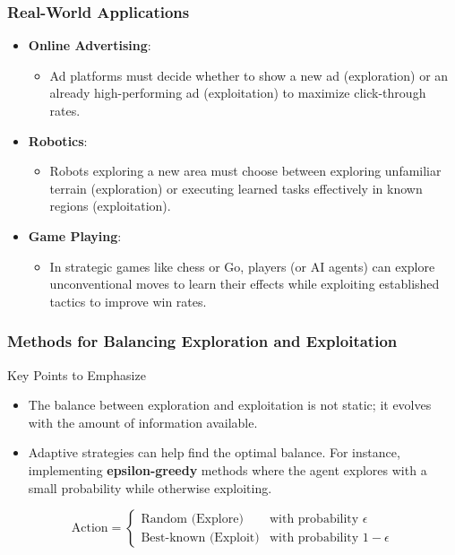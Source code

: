 \documentclass[aspectratio=169]{beamer}
\begin{document}
\begin{frame}[fragile]
    \frametitle{Real-World Applications}

    \begin{itemize}
        \item \textbf{Online Advertising}:
            \begin{itemize}
                \item Ad platforms must decide whether to show a new ad (exploration) or an already high-performing ad (exploitation) to maximize click-through rates.
            \end{itemize}
        
        \item \textbf{Robotics}:
            \begin{itemize}
                \item Robots exploring a new area must choose between exploring unfamiliar terrain (exploration) or executing learned tasks effectively in known regions (exploitation).
            \end{itemize}
        
        \item \textbf{Game Playing}:
            \begin{itemize}
                \item In strategic games like chess or Go, players (or AI agents) can explore unconventional moves to learn their effects while exploiting established tactics to improve win rates.
            \end{itemize}
    \end{itemize}
\end{frame}

\begin{frame}[fragile]
    \frametitle{Methods for Balancing Exploration and Exploitation}

    \begin{block}{Key Points to Emphasize}
        \begin{itemize}
            \item The balance between exploration and exploitation is not static; it evolves with the amount of information available.
            \item Adaptive strategies can help find the optimal balance. For instance, implementing \textbf{epsilon-greedy} methods where the agent explores with a small probability while otherwise exploiting.
        \end{itemize}
    \end{block}
    
    \begin{equation}
    \text{Action} = 
    \begin{cases} 
    \text{Random (Explore)} & \text{with probability } \epsilon \\
    \text{Best-known (Exploit)} & \text{with probability } 1 - \epsilon 
    \end{cases}
    \end{equation}
\end{frame}
\end{document}
